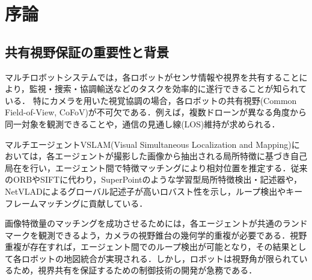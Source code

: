 \section{序論}

\subsection{共有視野保証の重要性と背景}

マルチロボットシステムでは，各ロボットがセンサ情報や視界を共有することにより，監視・捜索・協調輸送などのタスクを効率的に遂行できることが知られている．
特にカメラを用いた視覚協調の場合，各ロボットの共有視野(Common Field-of-View, CoFoV)が不可欠である．例えば，複数ドローンが異なる角度から同一対象を観測できることや，通信の見通し線(LOS)維持が求められる\cite{Panagou2017}．

マルチエージェントVSLAM(Visual Simultaneous Localization and Mapping)においては，各エージェントが撮影した画像から抽出される局所特徴に基づき自己局在を行い，エージェント間で特徴マッチングにより相対位置を推定する．従来のORBやSIFTに代わり，SuperPointのような学習型局所特徴検出・記述器\cite{DeTone2018}や，NetVLADによるグローバル記述子\cite{Arandjelovic2016}が高いロバスト性を示し，ループ検出やキーフレームマッチングに貢献している．

画像特徴量のマッチングを成功させるためには，各エージェントが共通のランドマークを観測できるよう，カメラの視野錐台の幾何学的重複が必要である．視野重複が存在すれば，エージェント間でのループ検出が可能となり，その結果として各ロボットの地図統合が実現される\cite{Zhang2022}．しかし，ロボットは視野角が限られているため，視界共有を保証するための制御技術の開発が急務である．


